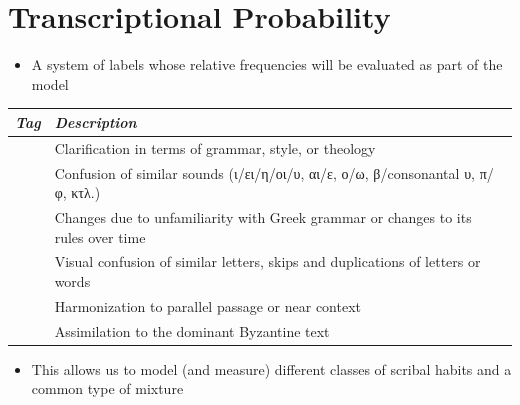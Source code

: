 \documentclass[10pt]{beamer}
\begin{document}
\begin{frame}
\begin{columns}[T]
\begin{column}{0.4\textwidth}
			\end{column}
		\end{columns}
	\end{frame}
	\section{Transcriptional Probability}
	\begin{frame}
		\begin{itemize}
			\item A system of labels whose relative frequencies will be evaluated as part of the model
		\end{itemize}
		\begin{center}
			\begin{tabular}{p{} p{}}
					\emph{Tag} & \emph{Description}\\
					\hline
					\Clarification{} & Clarification in terms of grammar, style, or theology\\
					\AuralConfusion{} & Confusion of similar sounds (\textgreek{ι}/\textgreek{ει}/\textgreek{η}/\textgreek{οι}/\textgreek{υ}, \textgreek{αι}/\textgreek{ε}, \textgreek{ο}/\textgreek{ω}, \textgreek{β}/consonantal \textgreek{υ}, \textgreek{π}/\textgreek{φ}, \textgreek{κτλ}.)\\
					\LinguisticConfusion{} & Changes due to unfamiliarity with Greek grammar or changes to its rules over time\\
					\VisualError{} & Visual confusion of similar letters, skips and duplications of letters or words\\
					\Harmonization{} & Harmonization to parallel passage or near context\\
					\Byzantine{} & Assimilation to the dominant Byzantine text
			\end{tabular}
		\end{center}
		\begin{itemize}
			\item This allows us to model (and measure) different classes of scribal habits and a common type of mixture
		\end{itemize}
	\end{frame}
\end{document}
